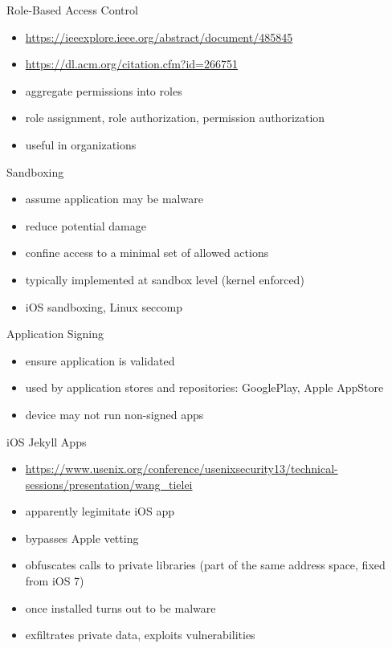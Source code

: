 \documentclass{curs}
\begin{document}
\begin{frame}{Role-Based Access Control}
  \begin{itemize}
    \pause \item \url{https://ieeexplore.ieee.org/abstract/document/485845}
    \pause \item \url{https://dl.acm.org/citation.cfm?id=266751}
    \pause \item aggregate permissions into roles
    \pause \item role assignment, role authorization, permission authorization
    \pause \item useful in organizations
  \end{itemize}
\end{frame}

\begin{frame}{Sandboxing}
  \begin{itemize}
    \pause \item assume application may be malware
    \pause \item reduce potential damage
    \pause \item confine access to a minimal set of allowed actions
    \pause \item typically implemented at sandbox level (kernel enforced)
    \pause \item iOS sandboxing, Linux seccomp
  \end{itemize}
\end{frame}

\begin{frame}{Application Signing}
  \begin{itemize}
    \pause \item ensure application is validated
    \pause \item used by application stores and repositories: GooglePlay, Apple AppStore
    \pause \item device may not run non-signed apps
  \end{itemize}
\end{frame}

\begin{frame}{iOS Jekyll Apps}
  \begin{itemize}
    \pause \item \url{https://www.usenix.org/conference/usenixsecurity13/technical-sessions/presentation/wang_tielei}
    \pause \item apparently legimitate iOS app
    \pause \item bypasses Apple vetting
    \pause \item obfuscates calls to private libraries (part of the same address space, fixed from iOS 7)
    \pause \item once installed turns out to be malware
    \pause \item exfiltrates private data, exploits vulnerabilities
  \end{itemize}
\end{frame}
\end{document}
